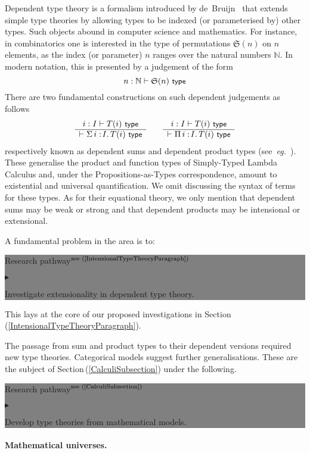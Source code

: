 \documentclass[11pt,twocolumn]{article}
\newenvironment{btritemize}
  {\begin{list}{\btr}
  {\setlength{\topsep}{2pt}
   \setlength{\partopsep}{2pt}
   \setlength{\itemsep}{2.5pt}
   \setlength{\parsep}{2.5pt}
   \setlength{\leftmargin}{1em}
   \setlength{\labelwidth}{.5em}}}
  {\end{list}}
\newcommand{\mysf}{\small\sf}
\newcommand{\mytextsf}[1]{\textsf{\small #1}}
\newcommand{\pref}[1]{\,(\ref{#1})}
\newcommand{\eg}{\emph{eg.}}
\newcommand{\btr}{$\blacktriangleright$}
\newcommand{\reqpsize}{8.113395cm}%
\newcommand{\rep}[2]{\begin{center}\colorbox{grey}{\begin{minipage}{\reqpsize}
  \mytextsf{Research pathway}\hfill$^{\mbox{\scriptsize see #1 }}$\\[-5.5mm]
  \begin{btritemize}
  \item #2
  \end{btritemize}
\end{minipage}}\end{center}}
\begin{document}
Dependent type theory is a formalism introduced by
de~Bruijn~\cite{deBruijn} that extends simple type theories by
allowing types to be indexed (or parameterised by) other types.  Such
objects abound in computer science and mathematics.  For instance, in
combinatorics one is interested in the type of permutations $\mathfrak
S(n)$ on $n$ elements, as the index (or parameter) $n$ ranges over the
natural numbers $\mathbb N$.  In modern notation, this is presented by a
judgement of the form
\[
  n:\mathbb N \vdash \mathfrak S(n) \mbox{ \mysf type}
\]
There are two fundamental constructions on such dependent judgements as
follows
\[
  \begin{array}{c}
  i: I \vdash T(i) \mbox{ \mysf type}
  \\ \hline
  \vdash \Sigma\,{i:\!I}.\, T(i) \mbox{ \mysf type}
  \end{array}
  \qquad
  \begin{array}{c}
  i: I \vdash T(i) \mbox{ \mysf type}
  \\ \hline
  \vdash \Pi\,{i:\!I}.\, T(i) \mbox{ \mysf type}
  \end{array}
\]
respectively known as dependent sums and dependent product types
(see~\eg~\cite{Jacobs}).  These generalise the product and function types of
Simply-Typed Lambda Calculus and, under the Propositions-as-Types
correspondence, amount to existential and universal quantification.  We omit
discussing the syntax of terms for these types.  As for their equational
theory, we only mention that dependent sums may be weak or strong and that
dependent products may be intensional or extensional.

A fundamental problem in the area is to:
\rep{(\ref{IntensionalTypeTheoryParagraph})}
  {Investigate extensionality in dependent type theory.}
This lays at the core of our proposed investigations in
Section\pref{IntensionalTypeTheoryParagraph}.

The passage from sum and product types to their dependent versions
required new type theories.  Categorical models suggest further
generalisations.  These are the subject of
Section\pref{CalculiSubsection}
under the following. 
\rep{(\ref{CalculiSubsection})}
  {Develop type theories from mathematical models.}

\paragraph{Mathematical universes.}
\label{MathematicalUniversesParagraph}
\end{document}

